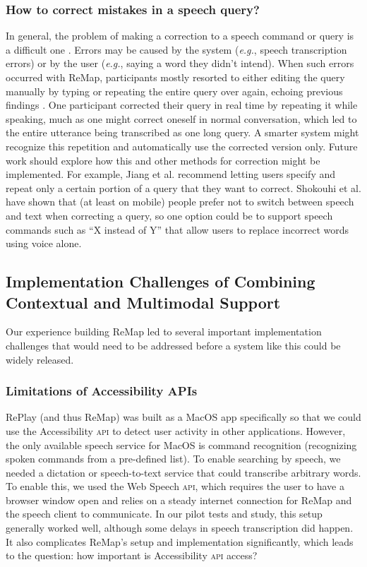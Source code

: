 \subsubsection{How to correct mistakes in a speech query?}
In general, the problem of making a correction to a speech command or query is a difficult one \cite{Myers2018, Jiang2013, Paek2008}. Errors may be caused by the system (\textit{e.g.}, speech transcription errors) or by the user (\textit{e.g.}, saying a word they didn't intend). When such errors occurred with ReMap, participants mostly resorted to either editing the query manually by typing or repeating the entire query over again, echoing previous findings \cite{Myers2018, Jiang2013}. One participant corrected their query in real time by repeating it while speaking, much as one might correct oneself in normal conversation, which led to the entire utterance being transcribed as one long query. A smarter system might recognize this repetition and automatically use the corrected version only. Future work should explore how this and other methods for correction might be implemented. For example, Jiang et al. \cite{Jiang2013} recommend letting users specify and repeat only a certain portion of a query that they want to correct. Shokouhi et al. \cite{Shokouhi2014} have shown that (at least on mobile) people prefer not to switch between speech and text when correcting a query, so one option could be to support speech commands such as ``X instead of Y'' that allow users to replace incorrect words using voice alone.

\subsection{Implementation Challenges of Combining Contextual and Multimodal Support}
Our experience building ReMap led to several important implementation challenges that would need to be addressed before a system like this could be widely released. 

\subsubsection{Limitations of Accessibility APIs}
RePlay (and thus ReMap) was built as a MacOS app specifically so that we could use the Accessibility \textsc{api} to detect user activity in other applications. However, the only available speech service for MacOS is command recognition (recognizing spoken commands from a pre-defined list). To enable searching by speech, we needed a dictation or speech-to-text service that could transcribe arbitrary words. To enable this, we used the Web Speech \textsc{api}, which requires the user to have a browser window open and relies on a steady internet connection for ReMap and the speech client to communicate. In our pilot tests and study, this setup generally worked well, although some delays in speech transcription did happen. It also complicates ReMap's setup and implementation significantly, which leads to the question: how important is Accessibility \textsc{api} access?

